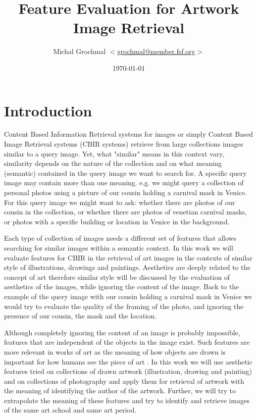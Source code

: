\documentclass[a4paper]{article}
\title{Feature Evaluation for Artwork Image Retrieval}
\author{Michal Grochmal
  $<$\href{mailto:grochmal@member.fsf.org}{grochmal@member.fsf.org}$>$
}
\date{\today}
\begin{document}
\maketitle

\section{Introduction}

Content Based Information Retrieval systems for images or simply Content Based
Image Retrieval systems (CBIR systems) retrieve from large collections images
similar to a query image.  Yet, what "similar" means in this context vary,
similarity depends on the nature of the collection and on what meaning
(semantic) contained in the query image we want to search for.  A specific
query image may contain more than one meaning.  e.g. we might query a
collection of personal photos using a picture of our cousin holding a carnival
mask in Venice.  For this query image we might want to ask: whether there are
photos of our cousin in the collection, or whether there are photos of venetian
carnival masks, or photos with a specific building or location in Venice in the
background.

Each type of collection of images needs a different set of features that allows
searching for similar images within a semantic context.  In this work we will
evaluate features for CBIR in the retrieval of art images in the contexts of
similar style of illustrations, drawings and paintings.  Aesthetics are deeply
related to the concept of art \cite{rmc12ajs} therefore similar style will be
discussed by the evaluation of aesthetics of the images, while ignoring the
content of the image.  Back to the example of the query image with our cousin
holding a carnival mask in Venice we would try to evaluate the quality of the
framing of the photo, and ignoring the presence of our cousin, the mask and the
location.

Although completely ignoring the content of an image is probably impossible,
features that are independent of the objects in the image exist.  Such features
are more relevant in works of art \cite{zirnhelt07art} as the meaning of how
objects are drawn is important for how humans see the piece of art
\cite{mach10clas}.  In this work we will use aesthetic features tried on
collections of drawn artwork (illustration, drawing and painting) and on
collections of photography and apply them for retrieval of artwork with the
meaning of identifying the author of the artwork.  Further, we will try to
extrapolate the meaning of these features and try to identify and retrieve
images of the same art school and same art period.
\end{document}

